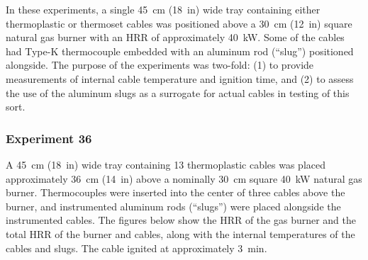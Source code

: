 In these experiments, a single 45~cm (18~in) wide tray containing either thermoplastic or thermoset cables was positioned above a 30~cm (12~in) square natural gas burner with an HRR of approximately 40~kW. Some of the cables had Type-K thermocouple embedded with an aluminum rod (``slug'') positioned alongside. The purpose of the experiments was two-fold: (1) to provide measurements of internal cable temperature and ignition time, and (2) to assess the use of the aluminum slugs as a surrogate for actual cables in testing of this sort.



\clearpage

\subsubsection{Experiment 36}

A 45~cm (18~in) wide tray containing 13 thermoplastic cables was placed approximately 36~cm (14~in) above a nominally 30~cm square 40~kW natural gas burner. Thermocouples were inserted into the center of three cables above the burner, and instrumented aluminum rods (``slugs'') were placed alongside the instrumented cables. The figures below show the HRR of the gas burner and the total HRR of the burner and cables, along with the internal temperatures of the cables and slugs. The cable ignited at approximately 3~min.

